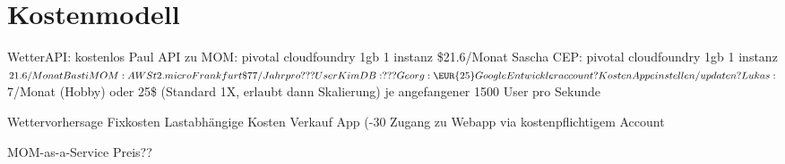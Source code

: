 \section{Kostenmodell}

WetterAPI: kostenlos
Paul API zu MOM: pivotal cloudfoundry 1gb 1 instanz 	\$21.6/Monat
Sascha CEP: pivotal cloudfoundry 1gb 1 instanz $21.6/Monat
Basti MOM: AWS t2.micro Frankfurt	 \$77/Jahr pro ??? User
Kim DB: ???
Georg: \EUR{25} Google Entwickleraccount? Kosten App einstellen/updaten?
Lukas: $7/Monat (Hobby) oder 25\$ (Standard 1X, erlaubt dann Skalierung) je angefangener 1500 User pro Sekunde


Wettervorhersage
Fixkosten
Lastabhängige Kosten
Verkauf App (-30%
Zugang zu Webapp via kostenpflichtigem Account

MOM-as-a-Service
Preis?? 